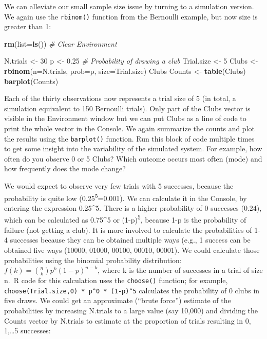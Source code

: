\documentclass[
]{krantz}
\makeatletter
\newenvironment{Shaded}{\begin{snugshade}}{\end{snugshade}}
\newcommand{\AttributeTok}[1]{\textcolor[rgb]{0.27,0.27,0.27}{#1}}
\newcommand{\CommentTok}[1]{\textcolor[rgb]{0.37,0.37,0.37}{\textit{#1}}}
\newcommand{\DecValTok}[1]{\textcolor[rgb]{0.06,0.06,0.06}{#1}}
\newcommand{\FloatTok}[1]{\textcolor[rgb]{0.06,0.06,0.06}{#1}}
\newcommand{\FunctionTok}[1]{\textcolor[rgb]{0.27,0.27,0.27}{\textbf{#1}}}
\newcommand{\NormalTok}[1]{#1}
\newcommand{\OtherTok}[1]{\textcolor[rgb]{0.37,0.37,0.37}{#1}}
\newenvironment{kframe}{%
\medskip{}
\setlength{\fboxsep}{.8em}
 \def\at@end@of@kframe{}%
 \ifinner\ifhmode%
  \def\at@end@of@kframe{\end{minipage}}%
  \begin{minipage}{\columnwidth}%
 \fi\fi%
 \def\FrameCommand##1{\hskip\@totalleftmargin \hskip-\fboxsep
 \colorbox{shadecolor}{##1}\hskip-\fboxsep
     \hskip-\linewidth \hskip-\@totalleftmargin \hskip\columnwidth}%
 \MakeFramed {\advance\hsize-\width
   \@totalleftmargin\z@ \linewidth\hsize
   \@setminipage}}%
 {\par\unskip\endMakeFramed%
 \at@end@of@kframe}
\renewenvironment{Shaded}{\begin{kframe}}{\end{kframe}}
\makeatother
\begin{document}
We can alleviate our small sample size issue by turning to a simulation version. We again use the \texttt{rbinom()} function from the Bernoulli example, but now size is greater than 1:

\begin{Shaded}
\begin{Highlighting}[]
\FunctionTok{rm}\NormalTok{(}\AttributeTok{list=}\FunctionTok{ls}\NormalTok{()) }\CommentTok{\# Clear Environment}

\NormalTok{N.trials }\OtherTok{\textless{}{-}} \DecValTok{30}
\NormalTok{p }\OtherTok{\textless{}{-}} \FloatTok{0.25} \CommentTok{\# Probability of drawing a club}
\NormalTok{Trial.size }\OtherTok{\textless{}{-}} \DecValTok{5}
\NormalTok{Clubs }\OtherTok{\textless{}{-}} \FunctionTok{rbinom}\NormalTok{(}\AttributeTok{n=}\NormalTok{N.trials, }\AttributeTok{prob=}\NormalTok{p, }\AttributeTok{size=}\NormalTok{Trial.size)}
\NormalTok{Clubs}
\NormalTok{Counts }\OtherTok{\textless{}{-}} \FunctionTok{table}\NormalTok{(Clubs)}
\FunctionTok{barplot}\NormalTok{(Counts)}
\end{Highlighting}
\end{Shaded}

Each of the thirty observations now represents a trial size of 5 (in total, a simulation equivalent to 150 Bernoulli trials). Only part of the Clubs vector is visible in the Environment window but we can put Clubs as a line of code to print the whole vector in the Console. We again summarize the counts and plot the results using the \texttt{barplot()} function. Run this block of code multiple times to get some insight into the variability of the simulated system. For example, how often do you observe 0 or 5 Clubs? Which outcome occurs most often (mode) and how frequently does the mode change?

We would expect to observe very few trials with 5 successes, because the probability is quite low (0.25\textsuperscript{5}=0.001). We can calculate it in the Console, by entering the expression 0.25\^{}5. There is a higher probability of 0 successes (0.24), which can be calculated as 0.75\^{}5 or (1-p)\textsuperscript{5}, because 1-p is the probability of failure (not getting a club). It is more involved to calculate the probabilities of 1-4 successes because they can be obtained multiple ways (e.g., 1 success can be obtained five ways (10000, 01000, 00100, 00010, 00001). We could calculate those probabilities using the binomial probability distribution: \(f(k) = {n \choose k} p^{k} (1-p)^{n-k}\), where k is the number of successes in a trial of size n.~R code for this calculation uses the \texttt{choose()} function; for example, \texttt{choose(Trial.size,0)\ *\ p\^{}0\ *\ (1-p)\^{}5} calculates the probability of 0 clubs in five draws. We could get an approximate (``brute force'') estimate of the probabilities by increasing N.trials to a large value (say 10,000) and dividing the Counts vector by N.trials to estimate at the proportion of trials resulting in 0, 1,\ldots5 successes:
\end{document}
